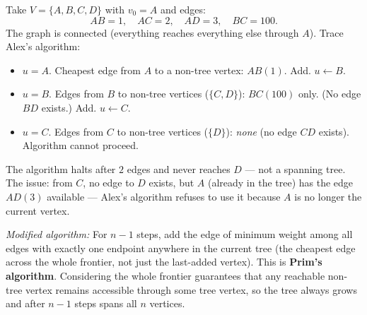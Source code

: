 \documentclass[test,letterpaper]{cs20}
\begin{document}
\begin{problem}
\begin{solution}
\subsolution Take $V = \{A, B, C, D\}$ with $v_0 = A$ and edges:
\[
AB = 1, \quad AC = 2, \quad AD = 3, \quad BC = 100.
\]
The graph is connected (everything reaches everything else through $A$). Trace Alex's algorithm:
\begin{itemize}
\item $u = A$. Cheapest edge from $A$ to a non-tree vertex: $AB(1)$. Add. $u \leftarrow B$.
\item $u = B$. Edges from $B$ to non-tree vertices ($\{C, D\}$): $BC(100)$ only. (No edge $BD$ exists.) Add. $u \leftarrow C$.
\item $u = C$. Edges from $C$ to non-tree vertices ($\{D\}$): \emph{none} (no edge $CD$ exists). Algorithm cannot proceed.
\end{itemize}
The algorithm halts after $2$ edges and never reaches $D$ --- not a spanning tree. The issue: from $C$, no edge to $D$ exists, but $A$ (already in the tree) has the edge $AD(3)$ available --- Alex's algorithm refuses to use it because $A$ is no longer the current vertex.

\subsolution \emph{Modified algorithm:} For $n - 1$ steps, add the edge of minimum weight among all edges with exactly one endpoint anywhere in the current tree (the cheapest edge across the whole frontier, not just the last-added vertex). This is \textbf{Prim's algorithm}. Considering the whole frontier guarantees that any reachable non-tree vertex remains accessible through some tree vertex, so the tree always grows and after $n - 1$ steps spans all $n$ vertices.
\end{solution}

\pagebreak

\end{problem}
\end{document}
